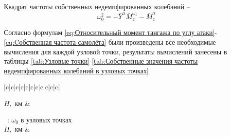     
    Квадрат частоты собственных недемпфированных колебаний --
    \begin{equation}
        \label{eq:Cобственная частота самолёта}
        \omega_0^2=-\bar{Y}^\alpha \bar{M}_z^{\omega_z}-\bar{M}_z^{\alpha}
    \end{equation}
    
    Согласно формулам \ref{eq:Относительный момент тангажа по углу атаки}-\ref{eq:Cобственная частота самолёта} были произведены все необходимые вычисления для каждой узловой точки, результаты вычислений занесены в таблицы \ref{tab:Узловые точки}-\ref{tab:Собственные значения частоты недемпфированных колебаний в узловых точках}


  \begin{longtable}[H]{|c|c|c|c|c|c|c|c|c|c|c|}
    \caption{$\omega_0$ в узловых точках (таб. \ref{tab:Узловые точки})\label{tab:Собственные значения частоты недемпфированных колебаний в узловых точках}}
    \hline 
    $H,$ км & \\ \hline
    \endfirsthead
    
    {{ \tablename\ \thetable{}: $\omega_0$ в узловых точках}} \\
    \hline 
    $H,$ км & \\ \hline
    \endhead
    \endfoot
    
    \hline \hline
    \endlastfoot


\end{longtable}
